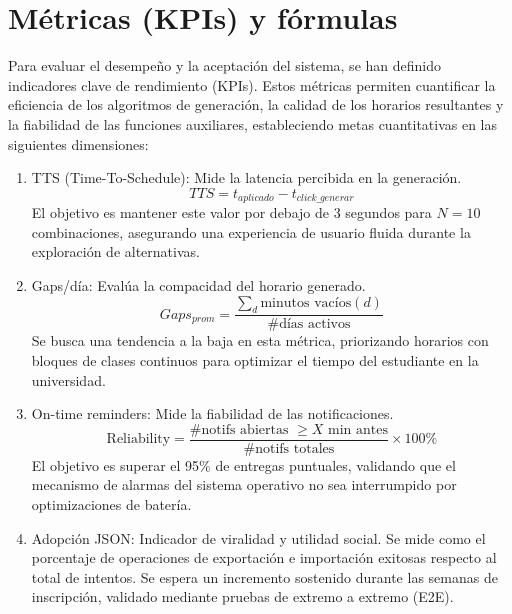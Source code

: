 \section{Métricas (KPIs) y fórmulas}
\label{sec:kpis}

Para evaluar el desempeño y la aceptación del sistema, se han definido indicadores clave de rendimiento (KPIs). Estos métricas permiten cuantificar la eficiencia de los algoritmos de generación, la calidad de los horarios resultantes y la fiabilidad de las funciones auxiliares, estableciendo metas cuantitativas en las siguientes dimensiones:

\begin{enumerate}
    \item TTS (Time-To-Schedule): Mide la latencia percibida en la generación.
    \begin{equation}
        TTS = t_{aplicado} - t_{click\_generar}
    \end{equation}
    El objetivo es mantener este valor por debajo de 3 segundos para $N=10$ combinaciones, asegurando una experiencia de usuario fluida durante la exploración de alternativas.

    \item Gaps/día: Evalúa la compacidad del horario generado.
    \begin{equation}
        Gaps_{prom} = \frac{\sum_{d} \text{minutos vacíos}(d)}{\text{\#días activos}}
    \end{equation}
    Se busca una tendencia a la baja en esta métrica, priorizando horarios con bloques de clases continuos para optimizar el tiempo del estudiante en la universidad.

    \item On-time reminders: Mide la fiabilidad de las notificaciones.
    \begin{equation}
        \text{Reliability} = \frac{\text{\#notifs abiertas } \ge X \text{ min antes}}{\text{\#notifs totales}} \times 100\%
    \end{equation}
    El objetivo es superar el 95\% de entregas puntuales, validando que el mecanismo de alarmas del sistema operativo no sea interrumpido por optimizaciones de batería.

    \item Adopción JSON: Indicador de viralidad y utilidad social.
    Se mide como el porcentaje de operaciones de exportación e importación exitosas respecto al total de intentos. Se espera un incremento sostenido durante las semanas de inscripción, validado mediante pruebas de extremo a extremo (E2E).
\end{enumerate}
